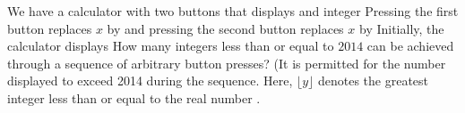 We have a calculator with two buttons that displays and integer  Pressing the first button replaces $x$ by  and pressing the second button replaces $x$ by  Initially, the calculator displays  How many integers less than or equal to $2014$ can be achieved through a sequence of arbitrary button presses? (It is permitted for the number displayed to exceed 2014 during the sequence. Here, $\lfloor y \rfloor$ denotes the greatest integer less than or equal to the real number .